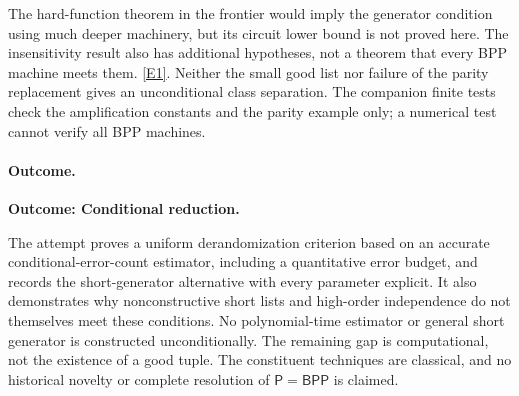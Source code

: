 \documentclass[11pt,a4paper]{article}
\newcommand{\eref}[2]{\hyperlink{extra:#1:#2}{[E#2]}}
\numberwithin{equation}{section}
\begin{document}
The hard-function theorem in the frontier would imply the generator
condition using much deeper machinery, but its circuit lower bound is
not proved here. The insensitivity result also has additional hypotheses,
not a theorem that every BPP machine meets them. \eref{3405}{1}.
Neither the small good list nor failure of the parity replacement gives
an unconditional class separation. The companion finite tests check the
amplification constants and the parity example only; a numerical test
cannot verify all BPP machines.

\paragraph{Outcome.}
\textbf{Outcome: Conditional reduction.}

The attempt proves a uniform derandomization criterion based on an
accurate conditional-error-count estimator, including a quantitative
error budget, and records the short-generator alternative with every
parameter explicit. It also demonstrates why nonconstructive short lists
and high-order independence do not themselves meet these conditions.
No polynomial-time estimator or general short generator is constructed
unconditionally. The remaining gap is computational, not the existence
of a good tuple. The constituent techniques are classical, and no
historical novelty or complete resolution of $\mathsf P=\mathsf{BPP}$
is claimed.

\end{document}
